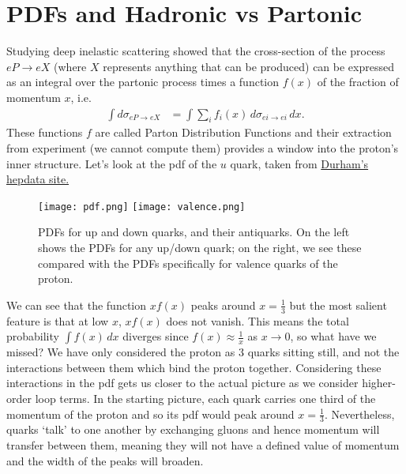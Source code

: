 \documentclass[a4paper, 11pt, normalem]{report}
\begin{document}
\chapter{PDFs and Hadronic vs Partonic}
Studying deep inelastic scattering showed that the cross-section of the process $eP\to eX$ (where $X$ represents anything that can be produced) can be expressed as an integral over the partonic process times a function $f(x)$ of the fraction of momentum $x$, i.e.
\begin{align}
    \int d\sigma_{eP\to eX} &= \int \sum_i f_i(x)\,d\sigma_{ei\to ei}\,dx.
\end{align}
These functions $f$ are called Parton Distribution Functions and their extraction from experiment (we cannot compute them) provides a window into the proton's inner structure.
Let's look at the pdf of the $u$ quark, taken from \href{http://hepdata.cedar.ac.uk/pdf/pdf3.html}{Durham's hepdata site.}
\begin{figure}[H]
    \centering
    \texttt{[image: pdf.png]}
    \texttt{[image: valence.png]}
    \caption{PDFs for up and down quarks, and their antiquarks. On the left shows the PDFs for any up/down quark; on the right, we see these compared with the PDFs specifically for valence quarks of the proton.}
    \vspace{-20pt}
\end{figure}
We can see that the function $xf(x)$ peaks around $x=\frac13$ but the most salient feature is that at low $x$, $xf(x)$ does not vanish.
This means the total probability $\int f(x)\,dx$ diverges since $f(x)\approx\frac1x$ as $x\to0$, so what have we missed?
We have only considered the proton as 3 quarks sitting still, and not the interactions between them which bind the proton together.
Considering these interactions in the pdf gets us closer to the actual picture as we consider higher-order loop terms.
In the starting picture, each quark carries one third of the momentum of the proton and so its pdf would peak around $x=\frac13$.
Nevertheless, quarks `talk' to one another by exchanging gluons and hence momentum will transfer between them, meaning they will not have a defined value of momentum and the width of the peaks will broaden.
\end{document}
